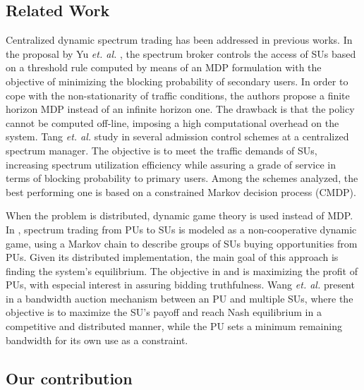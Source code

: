 \subsection{Related Work}\label{sec:Application}

Centralized dynamic spectrum trading has been addressed in previous works. In the proposal by Yu \textit{et. al.} \cite{ref:Yu2007}, the spectrum broker controls the access of SUs based on a threshold rule computed by means of an MDP formulation with the objective of minimizing the blocking probability of secondary users. In order to cope with the non-stationarity of traffic conditions, the authors propose a finite horizon MDP instead of an infinite horizon one. The drawback is that the policy cannot be computed off-line, imposing a high computational overhead on the system.
Tang \textit{et. al.} study in \cite{ref:Tang2009_per} several admission control schemes at a centralized spectrum manager. The objective is to meet the traffic demands of SUs, increasing spectrum utilization efficiency while assuring a grade of service in terms of blocking probability to primary users. Among the schemes analyzed, the best performing one is based on a constrained Markov decision process (CMDP).

When the problem is distributed, dynamic game theory is used instead of MDP.
In \cite{ref:Niyato}, spectrum trading from PUs to SUs is modeled as a non-cooperative dynamic game, using a Markov chain to describe groups of SUs buying opportunities from PUs. Given its distributed implementation, the main goal of this approach is finding the system's equilibrium. The objective in \cite{ref:eBay} and \cite{ref:Jia} is maximizing the profit of PUs, with especial interest in assuring bidding truthfulness. Wang \textit{et. al.} present in \cite{ref:Wang} a bandwidth auction mechanism between an PU and multiple SUs, where the objective is to maximize the SU's payoff and reach Nash equilibrium in a competitive and distributed manner, while the PU sets a minimum remaining bandwidth for its own use as a constraint. 

\subsection{Our contribution}

